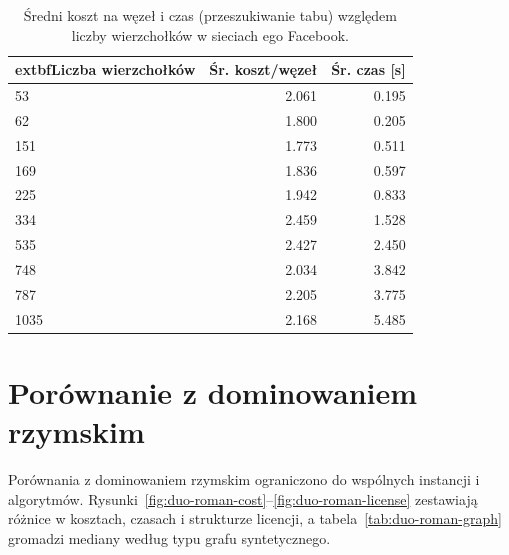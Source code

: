 \begin{table}[H]
  \centering
  \caption{Średni koszt na węzeł i czas (przeszukiwanie tabu) względem liczby wierzchołków w sieciach ego Facebook.}
  \label{tab:duo-real-size-table}
  \begin{tabular}{lrr}
    \toprule
    extbf{Liczba wierzchołków} & \textbf{Śr. koszt/węzeł} & \textbf{Śr. czas [s]} \\
    \midrule
    53                         & 2.061                    & 0.195                 \\
    62                         & 1.800                    & 0.205                 \\
    151                        & 1.773                    & 0.511                 \\
    169                        & 1.836                    & 0.597                 \\
    225                        & 1.942                    & 0.833                 \\
    334                        & 2.459                    & 1.528                 \\
    535                        & 2.427                    & 2.450                 \\
    748                        & 2.034                    & 3.842                 \\
    787                        & 2.205                    & 3.775                 \\
    1035                       & 2.168                    & 5.485                 \\
    \bottomrule
  \end{tabular}
\end{table}


\section{Porównanie z dominowaniem rzymskim}

Porównania z dominowaniem rzymskim ograniczono do wspólnych instancji i algorytmów. Rysunki~\ref{fig:duo-roman-cost}--\ref{fig:duo-roman-license} zestawiają różnice w kosztach, czasach i strukturze licencji, a tabela~\ref{tab:duo-roman-graph} gromadzi mediany według typu grafu syntetycznego.

